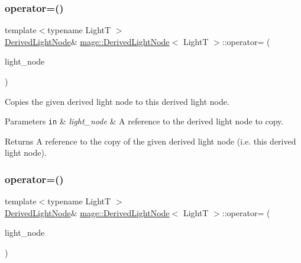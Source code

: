 \subsubsection{\texorpdfstring{operator=()}{operator=()}\hspace{0.1cm}{\footnotesize\ttfamily [1/2]}}
{\footnotesize\ttfamily template$<$typename LightT $>$ \\
\hyperlink{classmage_1_1_derived_light_node}{Derived\+Light\+Node}\& \hyperlink{classmage_1_1_derived_light_node}{mage\+::\+Derived\+Light\+Node}$<$ LightT $>$\+::operator= (\begin{DoxyParamCaption}\item[{const \hyperlink{classmage_1_1_derived_light_node}{Derived\+Light\+Node}$<$ LightT $>$ \&}]{light\+\_\+node }\end{DoxyParamCaption})\hspace{0.3cm}{\ttfamily [delete]}}

Copies the given derived light node to this derived light node.


\begin{DoxyParams}[1]{Parameters}
\mbox{\tt in}  & {\em light\+\_\+node} & A reference to the derived light node to copy. \\
\hline
\end{DoxyParams}
\begin{DoxyReturn}{Returns}
A reference to the copy of the given derived light node (i.\+e. this derived light node). 
\end{DoxyReturn}
\hypertarget{classmage_1_1_derived_light_node_a7eabbc97578958f97a7ec11728364eec}{}\label{classmage_1_1_derived_light_node_a7eabbc97578958f97a7ec11728364eec} 
\subsubsection{\texorpdfstring{operator=()}{operator=()}\hspace{0.1cm}{\footnotesize\ttfamily [2/2]}}
{\footnotesize\ttfamily template$<$typename LightT $>$ \\
\hyperlink{classmage_1_1_derived_light_node}{Derived\+Light\+Node}\& \hyperlink{classmage_1_1_derived_light_node}{mage\+::\+Derived\+Light\+Node}$<$ LightT $>$\+::operator= (\begin{DoxyParamCaption}\item[{\hyperlink{classmage_1_1_derived_light_node}{Derived\+Light\+Node}$<$ LightT $>$ \&\&}]{light\+\_\+node }\end{DoxyParamCaption})\hspace{0.3cm}{\ttfamily [delete]}}

